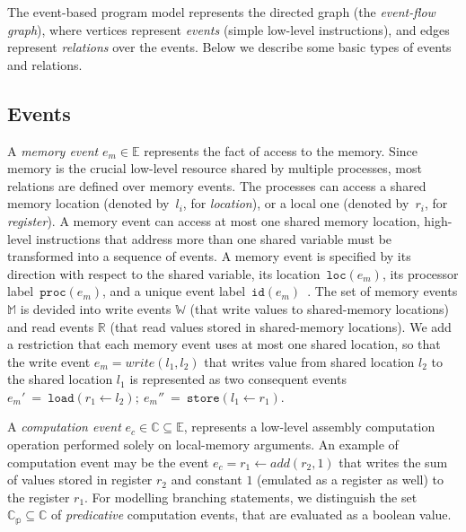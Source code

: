 The event-based program model represents the directed graph (the \textit{event-flow graph}), where vertices represent \textit{events} (simple low-level instructions), and edges represent \textit{relations} over the events.
Below we describe some basic types of events and relations.

\subsection{Events}
\label{ch:wmm:model:events}

A \textit{memory event} $e_m \in \mathbb{E}$ represents the fact of access to the memory. Since memory is the crucial low-level resource shared by multiple processes, most relations are defined over memory events. 
The processes can access a shared memory location (denoted by~$l_i$, for \textit{location}), or a local one (denoted by~$r_i$, for \textit{register}). A memory event can access at most one shared memory location, high-level instructions that address more than one shared variable must be transformed into a sequence of events. A memory event is specified by its direction with respect to the shared variable, its location~$\mathtt{loc}(e_m)$, its processor label~$\mathtt{proc}(e_m)$, and a unique event label~$\mathtt{id}(e_m)$~\cite{alglave2010shared}. 
The set of memory events $\mathbb{M}$ is devided into write events $\mathbb{W}$ (that write values to shared-memory locations) and read events $\mathbb{R}$ (that read values stored in shared-memory locations).
We add a restriction that each memory event uses at most one shared location, so that the write event $e_m = write(l_1, l_2)$ that writes value from shared location $l_2$ to the shared location $l_1$ is represented as two consequent events $e_m'~=~\mathtt{load}(r_1 \leftarrow l_2); \ e_m''~=~\mathtt{store}(l_1 \leftarrow r_1)$.

A \textit{computation event} $e_c \in \mathbb{C} \subseteq \mathbb{E}$, represents a low-level assembly computation operation performed solely on local-memory arguments. An example of computation event may be the event $e_c = r_1 \leftarrow add(r_2, 1)$ that writes the sum of values stored in register $r_2$ and constant $1$ (emulated as a register as well) to the register $r_1$. For modelling branching statements, we distinguish the set $\mathbb{C_{p}} \subseteq \mathbb{C}$ of \textit{predicative} computation events, that are evaluated as a boolean value.%

